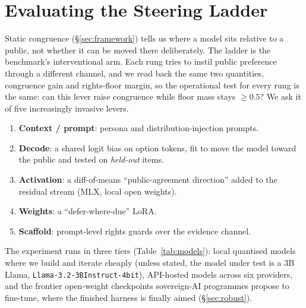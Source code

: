\documentclass[letterpaper]{article} %
\begin{document}
\section{Evaluating the Steering Ladder}\label{sec:ladder}

Static congruence (\S\ref{sec:framework}) tells us where a model sits relative to a
public, not whether it can be moved there deliberately. The ladder is the benchmark's
interventional arm. Each rung tries to instil public preference through a different
channel, and we read back the same two quantities, congruence gain and rights-floor
margin, so the operational test for every rung is the same: can this lever raise
congruence while floor mass stays $\geq 0.5$? We ask it of five increasingly invasive
levers.

\begin{enumerate}
\item \textbf{Context / prompt}: persona and distribution-injection prompts.
\item \textbf{Decode}: a shared logit bias on option tokens, fit to move the model
      toward the public and tested on \emph{held-out} items.
\item \textbf{Activation}: a diff-of-means ``public-agreement direction'' added to the
      residual stream (MLX, local open weights).
\item \textbf{Weights}: a ``defer-where-due'' LoRA.
\item \textbf{Scaffold}: prompt-level rights guards over the evidence channel.
\end{enumerate}

The experiment runs in three tiers (Table~\ref{tab:models}): local quantised models
where we build and iterate cheaply (unless stated, the model under test is a 3B Llama,
\texttt{Llama-3.2-3B\-Instruct-4bit}), API-hosted models across six providers, and the
frontier open-weight checkpoints sovereign-AI programmes propose to fine-tune, where the
finished harness is finally aimed (\S\ref{sec:robust}).
\end{document}
